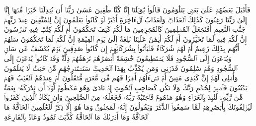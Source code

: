 \startbuffer[\q:68:30]
فَأَقۡبَلَ بَعۡضُهُمۡ عَلَىٰ بَعۡضࣲ یَتَلَٰوَمُونَ%
\stopbuffer%
\startbuffer[\q:68:31]
قَالُوا۟ یَٰوَیۡلَنَاۤ إِنَّا كُنَّا طَٰغِینَ%
\stopbuffer%
\startbuffer[\q:68:32]
عَسَىٰ رَبُّنَاۤ أَن یُبۡدِلَنَا خَیۡرࣰا مِّنۡهَاۤ إِنَّاۤ إِلَىٰ رَبِّنَا رَٰغِبُونَ%
\stopbuffer%
\startbuffer[\q:68:33]
كَذَٰلِكَ ٱلۡعَذَابُۖ وَلَعَذَابُ ٱلۡءَاخِرَةِ أَكۡبَرُۚ لَوۡ كَانُوا۟ یَعۡلَمُونَ%
\stopbuffer%
\startbuffer[\q:68:34]
إِنَّ لِلۡمُتَّقِینَ عِندَ رَبِّهِمۡ جَنَّٰتِ ٱلنَّعِیمِ%
\stopbuffer%
\startbuffer[\q:68:35]
أَفَنَجۡعَلُ ٱلۡمُسۡلِمِینَ كَٱلۡمُجۡرِمِینَ%
\stopbuffer%
\startbuffer[\q:68:36]
مَا لَكُمۡ كَیۡفَ تَحۡكُمُونَ%
\stopbuffer%
\startbuffer[\q:68:37]
أَمۡ لَكُمۡ كِتَٰبࣱ فِیهِ تَدۡرُسُونَ%
\stopbuffer%
\startbuffer[\q:68:38]
إِنَّ لَكُمۡ فِیهِ لَمَا تَخَیَّرُونَ%
\stopbuffer%
\startbuffer[\q:68:39]
أَمۡ لَكُمۡ أَیۡمَٰنٌ عَلَیۡنَا بَٰلِغَةٌ إِلَىٰ یَوۡمِ ٱلۡقِیَٰمَةِ إِنَّ لَكُمۡ لَمَا تَحۡكُمُونَ%
\stopbuffer%
\startbuffer[\q:68:40]
سَلۡهُمۡ أَیُّهُم بِذَٰلِكَ زَعِیمٌ%
\stopbuffer%
\startbuffer[\q:68:41]
أَمۡ لَهُمۡ شُرَكَاۤءُ فَلۡیَأۡتُوا۟ بِشُرَكَاۤئِهِمۡ إِن كَانُوا۟ صَٰدِقِینَ%
\stopbuffer%
\startbuffer[\q:68:42]
یَوۡمَ یُكۡشَفُ عَن سَاقࣲ وَیُدۡعَوۡنَ إِلَى ٱلسُّجُودِ فَلَا یَسۡتَطِیعُونَ%
\stopbuffer%
\startbuffer[\q:68:43]
خَٰشِعَةً أَبۡصَٰرُهُمۡ تَرۡهَقُهُمۡ ذِلَّةࣱۖ وَقَدۡ كَانُوا۟ یُدۡعَوۡنَ إِلَى ٱلسُّجُودِ وَهُمۡ سَٰلِمُونَ%
\stopbuffer%
\startbuffer[\q:68:44]
فَذَرۡنِی وَمَن یُكَذِّبُ بِهَٰذَا ٱلۡحَدِیثِۖ سَنَسۡتَدۡرِجُهُم مِّنۡ حَیۡثُ لَا یَعۡلَمُونَ%
\stopbuffer%
\startbuffer[\q:68:45]
وَأُمۡلِی لَهُمۡۚ إِنَّ كَیۡدِی مَتِینٌ%
\stopbuffer%
\startbuffer[\q:68:46]
أَمۡ تَسۡءَلُهُمۡ أَجۡرࣰا فَهُم مِّن مَّغۡرَمࣲ مُّثۡقَلُونَ%
\stopbuffer%
\startbuffer[\q:68:47]
أَمۡ عِندَهُمُ ٱلۡغَیۡبُ فَهُمۡ یَكۡتُبُونَ%
\stopbuffer%
\startbuffer[\q:68:48]
فَٱصۡبِرۡ لِحُكۡمِ رَبِّكَ وَلَا تَكُن كَصَاحِبِ ٱلۡحُوتِ إِذۡ نَادَىٰ وَهُوَ مَكۡظُومࣱ%
\stopbuffer%
\startbuffer[\q:68:49]
لَّوۡلَاۤ أَن تَدَٰرَكَهُۥ نِعۡمَةࣱ مِّن رَّبِّهِۦ لَنُبِذَ بِٱلۡعَرَاۤءِ وَهُوَ مَذۡمُومࣱ%
\stopbuffer%
\startbuffer[\q:68:50]
فَٱجۡتَبَٰهُ رَبُّهُۥ فَجَعَلَهُۥ مِنَ ٱلصَّٰلِحِینَ%
\stopbuffer%
\startbuffer[\q:68:51]
وَإِن یَكَادُ ٱلَّذِینَ كَفَرُوا۟ لَیُزۡلِقُونَكَ بِأَبۡصَٰرِهِمۡ لَمَّا سَمِعُوا۟ ٱلذِّكۡرَ وَیَقُولُونَ إِنَّهُۥ لَمَجۡنُونࣱ%
\stopbuffer%
\startbuffer[\q:68:52]
وَمَا هُوَ إِلَّا ذِكۡرࣱ لِّلۡعَٰلَمِینَ%
\stopbuffer%
\startbuffer[\q:69:1]
ٱلۡحَاۤقَّةُ%
\stopbuffer%
\startbuffer[\q:69:2]
مَا ٱلۡحَاۤقَّةُ%
\stopbuffer%
\startbuffer[\q:69:3]
وَمَاۤ أَدۡرَىٰكَ مَا ٱلۡحَاۤقَّةُ%
\stopbuffer%
\startbuffer[\q:69:4]
كَذَّبَتۡ ثَمُودُ وَعَادُۢ بِٱلۡقَارِعَةِ%
